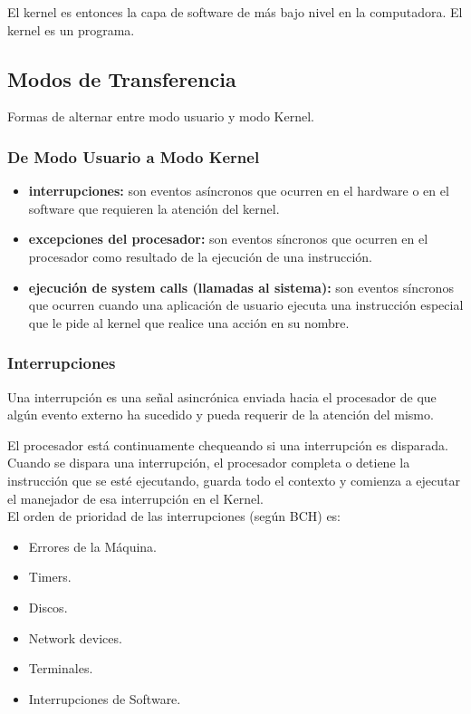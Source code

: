 \documentclass[../main.tex]{subfiles}
\begin{document}
        El kernel es entonces la capa de software de más bajo nivel en la computadora. El kernel es un programa.

    \subsection{Modos de Transferencia}
        Formas de alternar entre modo usuario y modo Kernel.
        
        \subsubsection*{De Modo Usuario a Modo Kernel}
            \begin{itemize}
                \item \textbf{interrupciones:} son eventos asíncronos que ocurren en el hardware o en el software que requieren la atención del kernel.
                \item \textbf{excepciones del procesador:} son eventos síncronos que ocurren en el procesador como resultado de la ejecución de una instrucción.
                \item \textbf{ejecución de system calls (llamadas al sistema):} son eventos síncronos que ocurren cuando una aplicación de usuario ejecuta una instrucción especial que le pide al kernel que realice una acción en su nombre.
            \end{itemize}
        
        \subsubsection*{Interrupciones}
            Una interrupción es una señal asincrónica enviada hacia el procesador de que algún evento externo ha sucedido y pueda requerir de la atención del mismo.

            El procesador está continuamente chequeando si una interrupción es disparada. Cuando se dispara una interrupción, el procesador completa o detiene la instrucción que se esté ejecutando, guarda todo el contexto y comienza a ejecutar el manejador de esa interrupción en el Kernel.\\
            
            El orden de prioridad de las interrupciones (según BCH) es:

            \begin{itemize}
                \item Errores de la Máquina.
                \item Timers.
                \item Discos.
                \item Network devices.
                \item Terminales.
                \item Interrupciones de Software.
            \end{itemize}
\end{document}
